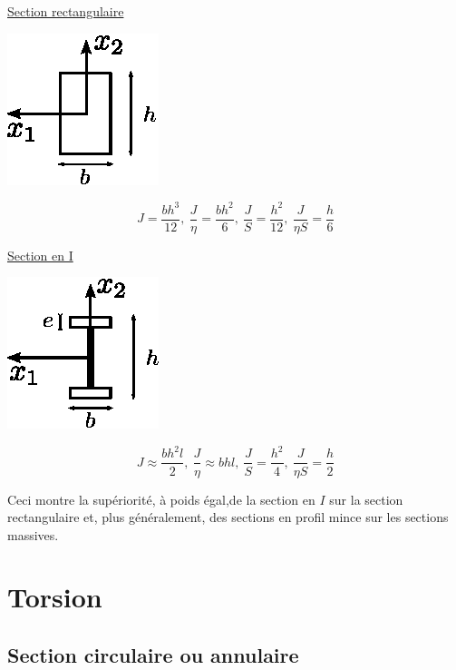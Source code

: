 \underline{Section rectangulaire}
\begin{multicols}{2}
    \begin{center}
        \includegraphics{../images/T1_Ch07-07}
    \end{center}
    \columnbreak
    \begin{displaymath}
        J = \frac{bh^3}{12},\ \frac{J}{\eta} = \frac{bh^2}{6},\ \frac{J}{S} = \frac{h^2}{12},\ \frac{J}{\eta S} = \frac{h}{6}
    \end{displaymath}
\end{multicols}
\underline{Section en I}
\begin{multicols}{2}
    \begin{center}
        \includegraphics{../images/T1_Ch07-08}
    \end{center}
    \columnbreak
    \begin{displaymath}
        J \approx \frac{bh^2l}{2},\ \frac{J}{\eta} \approx bhl,\ \frac{J}{S} = \frac{h^2}{4},\ \frac{J}{\eta S} = \frac{h}{2}
    \end{displaymath}
\end{multicols}
Ceci montre la supériorité, à poids égal,de la section en $I$ sur la section rectangulaire et, plus généralement, des sections en profil mince sur les sections massives.

\section{Torsion}
\subsection{Section circulaire ou annulaire}
\endinput
Avant d'aborder le cas général, nous allons envisager le cas simple d'une section circulaire ou annulaire. On ohserve alors qu'en torsion, chaque section droite tourne, par rapport à la section x1=O, d'un angle proportion­nel à la distance 


